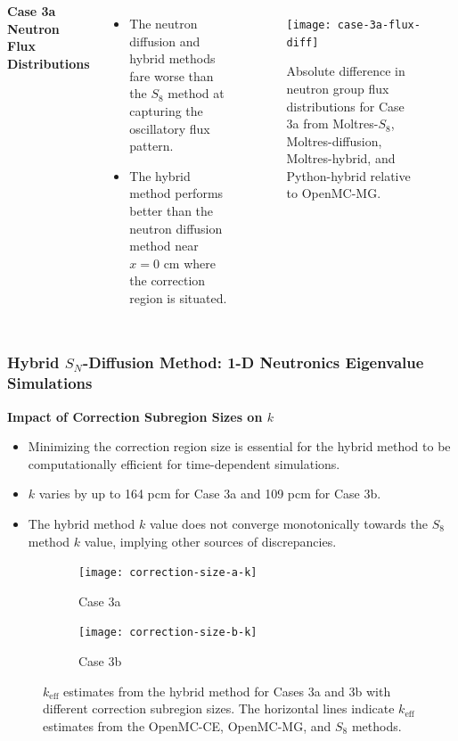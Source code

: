 \begin{frame}[noframenumbering]
  \begin{columns}
    \column{5.5cm}
    \textbf{Case 3a Neutron Flux Distributions}
    \begin{itemize}
      \item The neutron diffusion and hybrid methods fare worse than the $S_8$ method at capturing
        the oscillatory flux pattern.
      \item The hybrid method performs better than the neutron diffusion method near $x=0$ cm where
        the correction region is situated.
    \end{itemize}
    \column{5.5cm}
    \begin{figure}[htb!]
      \centering
      \texttt{[image: case-3a-flux-diff]}
      \caption{Absolute difference in neutron group flux distributions for Case 3a from Moltres-$S_8$,
      Moltres-diffusion, Moltres-hybrid, and Python-hybrid relative to OpenMC-MG.}
      \label{fig:3a-flux-diff}
    \end{figure}
  \end{columns}
\end{frame}

\begin{frame}[noframenumbering]
  \frametitle{Hybrid $S_N$-Diffusion Method: 1-D Neutronics Eigenvalue Simulations}
  \textbf{Impact of Correction Subregion Sizes on $k$}
  \begin{itemize}
    \item Minimizing the correction region size is essential for the hybrid method to be
      computationally efficient for time-dependent simulations.
    \item $k$ varies by up to 164 pcm for Case 3a and 109 pcm for Case 3b.
    \item The hybrid method $k$ value does not converge monotonically towards the $S_8$ method $k$ value,
      implying other sources of discrepancies.
  \end{itemize}
  \begin{figure}[h]
    \centering
    \begin{subfigure}[b]{0.49\columnwidth}
      \centering
      \texttt{[image: correction-size-a-k]}
      \caption{Case 3a}
      \label{fig:v1-size-a-k}
    \end{subfigure}
    \hfill
    \begin{subfigure}[b]{0.49\columnwidth}
      \centering
      \texttt{[image: correction-size-b-k]}
      \caption{Case 3b}
      \label{fig:v1-size-b-k}
    \end{subfigure}
    \caption{$k_\text{eff}$ estimates from the hybrid method for Cases 3a and 3b with different
    correction subregion sizes. The horizontal lines indicate $k_\text{eff}$ estimates from the
    OpenMC-CE, OpenMC-MG, and $S_8$ methods.}
    \label{fig:v1-size-k}
  \end{figure}
\end{frame}


